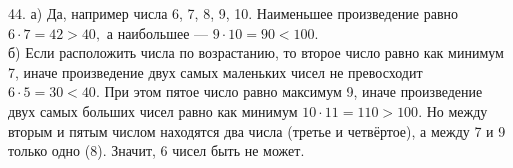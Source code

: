 44. а) Да, например числа 6, 7, 8, 9, 10. Наименьшее произведение равно $6\cdot7=42>40,$ а наибольшее --- $9\cdot10=90<100.$\\
б) Если расположить числа по возрастанию, то второе число равно как минимум 7, иначе произведение двух самых маленьких чисел не превосходит $6\cdot5=30<40.$ При этом пятое число равно максимум 9, иначе произведение двух самых больших чисел равно как минимум $10\cdot11=110>100.$ Но между вторым и пятым числом находятся два числа (третье и четвёртое), а между 7 и 9 только одно (8). Значит, 6 чисел быть не может.\\
